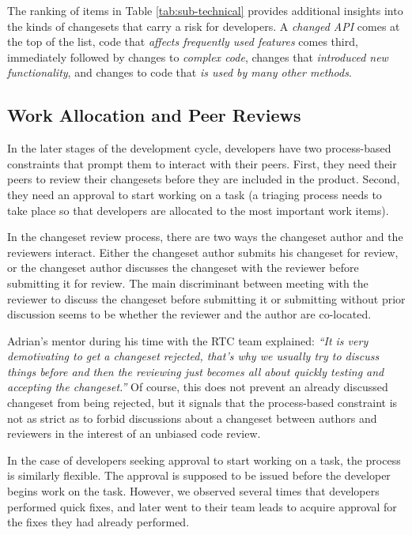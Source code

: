 The ranking of items in Table \ref{tab:sub-technical} provides additional insights into the kinds of changesets that carry a risk for developers. A \emph{changed API} comes at the top of the list, code that \emph{affects frequently used features} comes third, immediately followed by changes to \emph{complex code}, changes that \emph{introduced new functionality}, and changes to code that \emph{is used by many other methods}.


\subsection{Work Allocation and Peer Reviews}
In the later stages of the development cycle, developers have two process-based constraints that prompt them to interact with their peers. First, they need their peers to review their changesets before they are included in the product. Second, they need an approval to start working on a task (a triaging process needs to take place so that developers are allocated to the most important work items).

In the changeset review process, there are two ways the changeset author and the reviewers interact.
Either the changeset author submits his changeset for review, or the changeset author discusses the changeset with the reviewer before submitting it for review. The main discriminant between meeting with the reviewer to discuss the changeset before submitting it or submitting without prior discussion seems to be whether the reviewer and the author are co-located.

Adrian's mentor during his time with the RTC team explained: \emph{``It is very demotivating to get a changeset rejected, that's why we usually try to discuss things before and then the reviewing just becomes all about quickly testing and accepting the changeset.''} Of course, this does not prevent an already discussed changeset from being rejected, but it signals that the process-based constraint is not as strict as to forbid discussions about a changeset between authors and reviewers in the interest of an unbiased code review.

In the case of developers seeking approval to start working on a task, the process is similarly flexible. The approval is supposed to be issued before the developer begins work on the task. However, we observed several times that developers performed quick fixes, and later went to their team leads to acquire approval for the fixes they had already performed.

